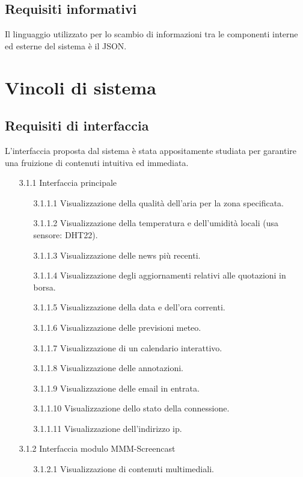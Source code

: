 \documentclass[a4paper,11pt,titlepage]{article}       %
\begin{document}
        
    \subsection{Requisiti informativi}
        Il linguaggio utilizzato per lo scambio di informazioni tra le componenti interne ed esterne del sistema è il JSON.

\newpage

\section{Vincoli di sistema}
    
    \subsection{Requisiti di interfaccia}
        L'interfaccia proposta dal sistema è stata appositamente studiata per garantire una fruizione di contenuti intuitiva ed immediata.
        
        \begin{itemize}
            \item[3.1.1] Interfaccia principale
                \begin{itemize}
                    \item[3.1.1.1] Visualizzazione della qualità dell'aria per la zona specificata.
                    \item[3.1.1.2] Visualizzazione della temperatura e dell'umidità locali (usa sensore: DHT22).
                    \item[3.1.1.3] Visualizzazione delle news più recenti.
                    \item[3.1.1.4] Visualizzazione degli aggiornamenti relativi alle quotazioni in borsa.
                    \item[3.1.1.5] Visualizzazione della data e dell'ora correnti.
                    \item[3.1.1.6] Visualizzazione delle previsioni meteo.
                    \item[3.1.1.7] Visualizzazione di un calendario interattivo.
                    \item[3.1.1.8] Visualizzazione delle annotazioni.
                    \item[3.1.1.9] Visualizzazione delle email in entrata.
                    \item[3.1.1.10] Visualizzazione dello stato della connessione.
                    \item[3.1.1.11] Visualizzazione dell'indirizzo ip.
                \end{itemize}   
                
            \item[3.1.2] Interfaccia modulo MMM-Screencast
                \begin{itemize}
                    \item[3.1.2.1] Visualizzazione di contenuti multimediali.
                \end{itemize}
        \end{itemize}
    
\end{document}
